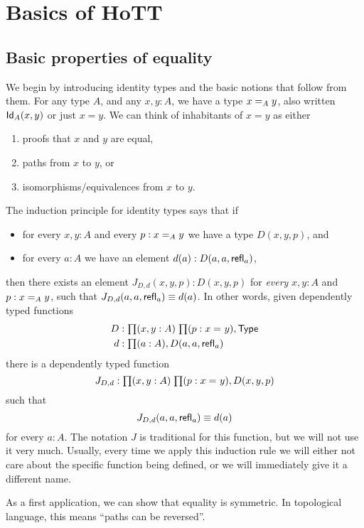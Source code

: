 \chapter{Basics of HoTT}
\label{cha:basics}

\section{Basic properties of equality}
\label{sec:equality}


We begin by introducing identity types and the basic notions that follow from them.
For any type $A$, and any $x,y:A$, we have a type $\id[A]{x}{y}$, also written $\idtype[A]{x}{y}$ or just $x=y$.
We can think of inhabitants of $x=y$ as either
\begin{enumerate}
\item proofs that $x$ and $y$ are equal,
\item paths from $x$ to $y$, or
\item isomorphisms/equivalences from $x$ to $y$.
\end{enumerate}
The induction principle for identity types says that if
\begin{itemize}
\item for every $x,y:A$ and every $p:\id[A]xy$ we have a type $D(x,y,p)$, and
\item for every $a:A$ we have an element $d(a):D(a,a,\refl a)$, 
\end{itemize}
then there exists an element $J_{D,d}(x,y,p):D(x,y,p)$ for \emph{every} $x,y:A$ and $p:\id[A]xy$, such that $J_{D,d}(a,a,\refl a) \jdeq d(a)$.
In other words, given dependently typed functions
\begin{align*}
D & :\prd{x,y:A}{p:\id{x}{y}} \type\\
d & :\prd{a:A} D(a,a,\refl{a})
\end{align*}
there is a dependently typed function
\[J_{D,d}:\prd{x,y:A}{p:\id{x}{y}} D(x,y,p)\]
such that 
\begin{equation}\label{eq:Jconv}
J_{D,d}(a,a,\refl{a})\jdeq d(a)
\end{equation}
for every $a:A$.
The notation $J$ is traditional for this function, but we will not use it very much.
Usually, every time we apply this induction rule we will either not care about the specific function being defined, or we will immediately give it a different name.

As a first application, we can show that equality is symmetric.
In topological language, this means ``paths can be reversed''.

